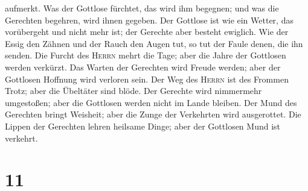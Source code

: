 aufmerkt.  Was der Gottlose fürchtet, das wird ihm
begegnen; und was die Gerechten begehren, wird ihnen gegeben.
 Der Gottlose ist wie ein Wetter, das vorübergeht und
nicht mehr ist; der Gerechte aber besteht ewiglich.  Wie
der Essig den Zähnen und der Rauch den Augen tut, so tut der Faule
denen, die ihn senden.  Die Furcht des \textsc{Herrn}
mehrt die Tage; aber die Jahre der Gottlosen werden verkürzt.
 Das Warten der Gerechten wird Freude werden; aber der
Gottlosen Hoffnung wird verloren sein.  Der Weg des
\textsc{Herrn} ist des Frommen Trotz; aber die Übeltäter sind blöde.
 Der Gerechte wird nimmermehr umgestoßen; aber die
Gottlosen werden nicht im Lande bleiben.  Der Mund des
Gerechten bringt Weisheit; aber die Zunge der Verkehrten wird
ausgerottet.  Die Lippen der Gerechten lehren heilsame
Dinge; aber der Gottlosen Mund ist verkehrt.

\hypertarget{section-10}{%
\section{11}\label{section-10}}

